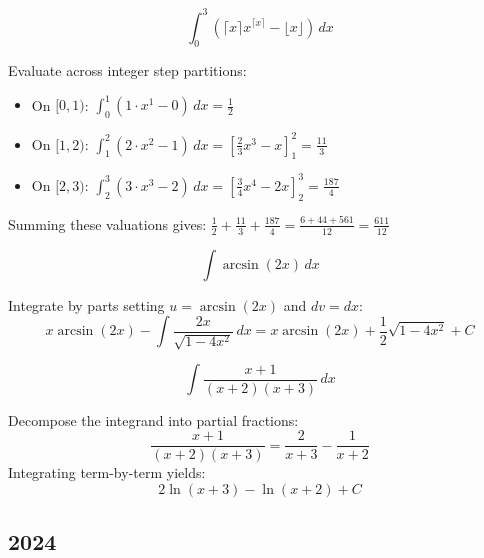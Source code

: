 \begin{questions}
\question
\[ \int_0^3 \left( \lceil x \rceil x^{\lceil x \rceil} - \lfloor x \rfloor \right) \,dx \]
\begin{solution}
Evaluate across integer step partitions:
\begin{itemize}
    \item On $[0,1)$: $\int_0^1 (1 \cdot x^1 - 0) \,dx = \frac{1}{2}$
    \item On $[1,2)$: $\int_1^2 (2 \cdot x^2 - 1) \,dx = \left[ \frac{2}{3}x^3 - x \right]_1^2 = \frac{11}{3}$
    \item On $[2,3)$: $\int_2^3 (3 \cdot x^3 - 2) \,dx = \left[ \frac{3}{4}x^4 - 2x \right]_2^3 = \frac{187}{4}$
\end{itemize}
Summing these valuations gives: $\frac{1}{2} + \frac{11}{3} + \frac{187}{4} = \frac{6 + 44 + 561}{12} = \frac{611}{12}$
\end{solution}

\question
\[ \int \arcsin(2x) \,dx \]
\begin{solution}
Integrate by parts setting $u = \arcsin(2x)$ and $dv = dx$:
\[ x\arcsin(2x) - \int \frac{2x}{\sqrt{1-4x^2}} \,dx = x\arcsin(2x) + \frac{1}{2}\sqrt{1-4x^2} + C \]
\end{solution}

\question
\[ \int \frac{x+1}{(x+2)(x+3)} \,dx \]
\begin{solution}
Decompose the integrand into partial fractions:
\[ \frac{x+1}{(x+2)(x+3)} = \frac{2}{x+3} - \frac{1}{x+2} \]
Integrating term-by-term yields:
\[ 2\ln(x+3) - \ln(x+2) + C \]
\end{solution}

\end{questions}

\subsection*{2024}
